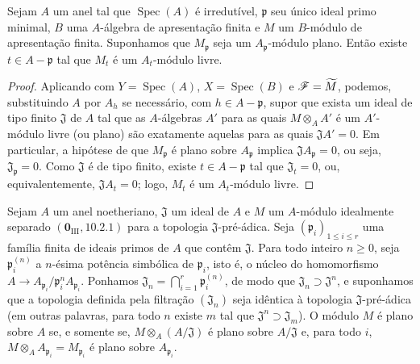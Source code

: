 \begin{corollary}[11.4.6]
\label{IV.11.4.6}
Sejam $A$ um anel tal que
$\operatorname{Spec}(A)$ é
irredutível, $\mathfrak p$
seu único ideal primo minimal,
$B$ uma $A$-álgebra de
apresentação finita e $M$ um
$B$-módulo de apresentação
finita. Suponhamos que
$M_\mathfrak p$ seja um
$A_\mathfrak p$-módulo plano.
Então existe
$t\in A-\mathfrak p$ tal que
$M_t$ é um $A_t$-módulo
livre.
\end{corollary}

\begin{proof}
Aplicando 
com
$Y=\operatorname{Spec}(A)$,
$X=\operatorname{Spec}(B)$
e $\mathscr{F}=\widetilde M$,
podemos, substituindo $A$ por
$A_h$ se necessário, com
$h\in A-\mathfrak p$, supor
que exista um ideal de tipo
finito $\mathfrak J$ de $A$
tal que as $A$-álgebras $A'$
para as quais
$M\otimes_A A'$ é um
$A'$-módulo livre (ou plano)
são exatamente aquelas para
as quais $\mathfrak JA'=0$.
Em particular, a hipótese de
que $M_\mathfrak p$ é plano
sobre $A_\mathfrak p$
implica
$\mathfrak JA_\mathfrak p=0$,
ou seja,
$\mathfrak J_\mathfrak p=0$.
Como $\mathfrak J$ é de tipo
finito, existe
$t\in A-\mathfrak p$ tal que
$\mathfrak J_t=0$, ou,
equivalentemente,
$\mathfrak JA_t=0$; logo,
$M_t$ é um $A_t$-módulo
livre.
\end{proof}

\begin{proposition}[11.4.7]
\label{IV.11.4.7}
Sejam $A$ um anel
noetheriano, $\mathfrak J$
um ideal de $A$ e $M$ um
$A$-módulo idealmente
separado
$(\mathbf 0_{\mathrm{III}},10.2.1)$
para a topologia
$\mathfrak J$-pré-ádica.
Seja
$(\mathfrak p_i)_{1\leq i\leq r}$
uma família finita de ideais
primos de $A$ que contêm
$\mathfrak J$. Para todo
inteiro $n\geq0$, seja
$\mathfrak p_i^{(n)}$ a
$n$-ésima potência simbólica
de $\mathfrak p_i$, isto é, o
núcleo do homomorfismo
$A\to
A_{\mathfrak p_i}/
\mathfrak p_i^nA_{\mathfrak p_i}$.
Ponhamos
$\mathfrak J_n=
\bigcap_{i=1}^{r}
\mathfrak p_i^{(n)}$, de modo
que
$\mathfrak J_n\supset
\mathfrak J^n$, e suponhamos
que a topologia definida pela
filtração $(\mathfrak J_n)$
seja idêntica à topologia
$\mathfrak J$-pré-ádica
(em outras palavras, para
todo $n$ existe $m$ tal que
$\mathfrak J^n\supset
\mathfrak J_m$).
O módulo $M$ é plano sobre
$A$ se, e somente se,
$M\otimes_A(A/\mathfrak J)$
é plano sobre $A/\mathfrak J$
e, para todo $i$,
$M\otimes_A A_{\mathfrak p_i}
=M_{\mathfrak p_i}$
é plano sobre
$A_{\mathfrak p_i}$.
\end{proposition}

